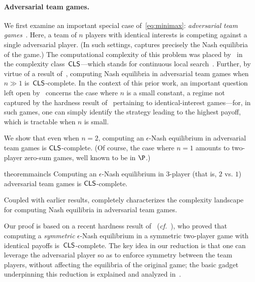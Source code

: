 \paragraph{Adversarial team games.} We first examine an important special case of~\eqref{eq:minimax}: \emph{adversarial team games}~\citep{Stengel97:Team}. Here, a team of $n$ players with identical interests is competing against a single adversarial player. (In such settings,  captures precisely the Nash equilibria of the game.) The computational complexity of this problem was placed by~\citet{Anagnostides23:Algorithms} in the complexity class~$\mathsf{CLS}$---which stands for continuous local search~\citep{Daskalakis11:Continuous}. Further, by virtue of a result of~\citet{Babichenko21:Settling}, computing Nash equilibria in adversarial team games when $n \gg 1$ is~$\mathsf{CLS}$-complete. In the context of this prior work, an important question left open by~\citet{Anagnostides23:Algorithms} concerns the case where $n$ is a small constant, a regime not captured by the hardness result of~\citet{Babichenko21:Settling} pertaining to identical-interest games---for, in such games, one can simply identify the strategy leading to the highest payoff, which is tractable when $n$ is small.

We show that even when $n = 2$, computing an $\epsilon$-Nash equilibrium in adversarial team games is $\mathsf{CLS}$-complete. (Of course, the case where $n=1$ amounts to two-player zero-sum games, well known to be in $\P$.)

\begin{restatable}{theorem}{maincls}
    \label{theorem:cls-completeness}
    Computing an $\epsilon$-Nash equilibrium in $3$-player (that is, $2$ vs. $1$) adversarial team games is $\mathsf{CLS}$-complete.
\end{restatable}

Coupled with earlier results,  completely characterizes the complexity landscape for computing Nash equilibria in adversarial team games.

Our proof is based on a recent hardness result of~\citet{ghosh2024complexitysymmetricbimatrixgames} (\emph{cf.}~\citet{Tewolde25:Computing}), who proved that computing a \emph{symmetric} $\epsilon$-Nash equilibrium in a symmetric two-player game with identical payoffs is~$\mathsf{CLS}$-complete. The key idea in our reduction is that one can leverage the adversarial player so as to enforce symmetry between the team players, without affecting the equilibria of the original game; the basic gadget underpinning this reduction is explained and analyzed in~.

